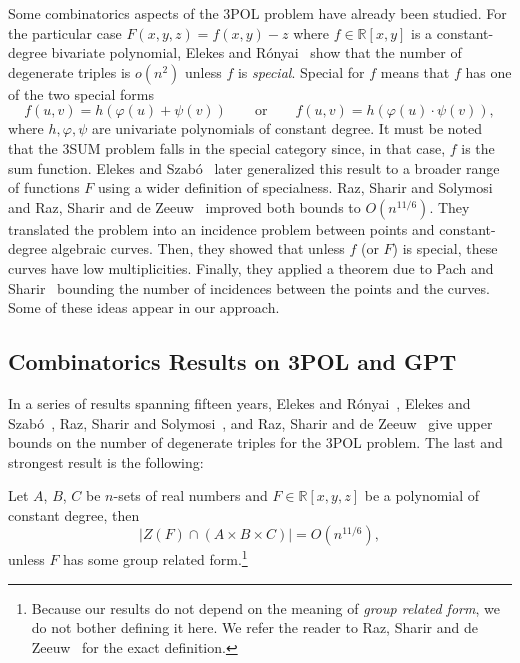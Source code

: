 Some combinatorics aspects of the 3POL problem have already been studied.
%
For the particular case $F(x,y,z) = f(x,y) - z$ where $f \in \mathbb{R}[x,y]$
is a constant-degree bivariate polynomial, Elekes and Rónyai~\cite{ER00} show
that the number of degenerate triples is $o(n^2)$ unless $f$ is
\emph{special}. Special for $f$ means that $f$ has one of the two special forms
\begin{displaymath}
f(u,v)=h(\varphi(u)+\psi(v))
\qquad
\text{or}
\qquad
f(u,v)=h(\varphi(u)\cdot\psi(v)),
\end{displaymath}
where $h,\varphi,\psi$ are univariate polynomials of constant degree.
It must be noted that the 3SUM problem falls in the special category since, in
that case, \( f \) is the sum function.
%
Elekes and Szabó~\cite{ES12} later generalized this result to a broader range
of functions $F$ using a wider definition of specialness.
%
Raz, Sharir and Solymosi~\cite{RSS14} and Raz, Sharir and de Zeeuw~\cite{RSZ15}
improved both bounds to $O(n^{11/6})$.
%
They translated the problem into an incidence problem between points and
constant-degree algebraic curves. Then, they showed that unless $f$ (or $F$) is
special, these curves have low multiplicities. Finally, they applied a theorem
due to Pach and Sharir~\cite{PS98} bounding the number of incidences between
the points and the curves. Some of these ideas appear in our approach.


\subsection{Combinatorics Results on 3POL and GPT}
In a series of results spanning fifteen years,
Elekes and Rónyai~\cite{ER00},
Elekes and Szabó~\cite{ES12},
Raz, Sharir and Solymosi~\cite{RSS14}, and
Raz, Sharir and de Zeeuw~\cite{RSZ15}
give upper bounds on the number of degenerate triples for the 3POL problem.
The last and strongest result is the following:
\begin{theorem}
	Let $A$, $B$, $C$ be $n$-sets of real numbers and $F \in \mathbb{R}[x,y,z]$
	be a polynomial of constant degree, then
	\begin{displaymath}
		| Z(F) \cap ( A \times B \times C ) | = O(n^{11/6}),
	\end{displaymath}
	unless $F$ has some group related form.\footnote{Because our results do not
	depend on the meaning of \emph{group related form}, we do not bother
	defining it here. We refer the reader to Raz, Sharir and de Zeeuw~\cite{RSZ15}
	for the exact definition.}
\end{theorem}

